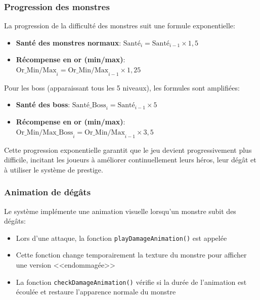 \documentclass[11pt,a4paper]{article}
\begin{document}
\subsubsection{Progression des monstres}
La progression de la difficulté des monstres suit une formule exponentielle:
\begin{itemize}
    \item \textbf{Santé des monstres normaux}: $\text{Santé}_i = \text{Santé}_{i-1} \times 1,5$
\item \textbf{Récompense en or (min/max)}:\\ $\text{Or\_Min/Max}_i = \text{Or\_Min/Max}_{i-1} \times 1,25$
\end{itemize}

Pour les boss (apparaissant tous les 5 niveaux), les formules sont amplifiées:
\begin{itemize}
    \item \textbf{Santé des boss}: $\text{Santé\_Boss}_i = \text{Santé}_{i-1} \times 5$
    \item \textbf{Récompense en or (min/max)}:\\ $\text{Or\_Min/Max\_Boss}_i = \text{Or\_Min/Max}_{i-1} \times 3,5$
\end{itemize}

Cette progression exponentielle garantit que le jeu devient progressivement plus difficile, incitant les joueurs à améliorer continuellement leurs héros, leur dégât et à utiliser le système de prestige.

\subsubsection{Animation de dégâts}
Le système implémente une animation visuelle lorsqu'un monstre subit des dégâts:
\begin{itemize}
    \item Lors d'une attaque, la fonction \texttt{playDamageAnimation()} est appelée
    \item Cette fonction change temporairement la texture du monstre pour afficher une version <<endommagée>>
    \item La fonction \texttt{checkDamageAnimation()} vérifie si la durée de l'animation est écoulée et restaure l'apparence normale du monstre
\end{itemize}
\end{document}
